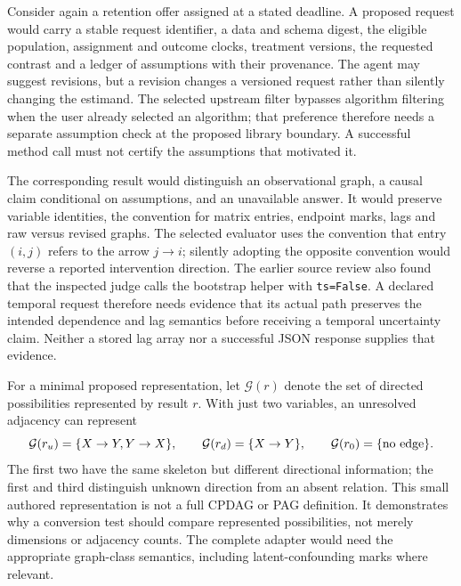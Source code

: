 Consider again a retention offer assigned at a stated deadline. A proposed
request would carry a stable request identifier, a data and schema digest,
the eligible population, assignment and outcome clocks, treatment versions,
the requested contrast and a ledger of assumptions with their provenance.
The agent may suggest revisions, but a revision changes a versioned request
rather than silently changing the estimand. The selected upstream filter
bypasses algorithm filtering when the user already selected an algorithm;
that preference therefore needs a separate assumption check at the proposed
library boundary. A successful method call must not certify the assumptions
that motivated it.~\citep{exec17_copilot_code}

The corresponding result would distinguish an observational graph, a causal
claim conditional on assumptions, and an unavailable answer. It would preserve
variable identities, the convention for matrix entries, endpoint marks, lags
and raw versus revised graphs. The selected evaluator uses the convention
that entry $(i,j)$ refers to the arrow $j\to i$; silently adopting the
opposite convention would reverse a reported intervention direction. The
earlier source review also found that the inspected judge calls the bootstrap
helper with \texttt{ts=False}. A declared temporal request therefore needs
evidence that its actual path preserves the intended dependence and lag
semantics before receiving a temporal uncertainty claim. Neither a stored
lag array nor a successful JSON response supplies that evidence.
\citep{exec17_copilot_code}

For a minimal proposed representation, let $\mathcal G(r)$ denote the set of
directed possibilities represented by result $r$. With just two variables,
an unresolved adjacency can represent
\[
 \mathcal G(r_u)=\{X\to Y,Y\to X\},\qquad
 \mathcal G(r_d)=\{X\to Y\},\qquad
 \mathcal G(r_0)=\{\hbox{no edge}\}.
\]
The first two have the same skeleton but different directional information;
the first and third distinguish unknown direction from an absent relation.
This small authored representation is not a full CPDAG or PAG definition. It
demonstrates why a conversion test should compare represented possibilities,
not merely dimensions or adjacency counts. The complete adapter would need
the appropriate graph-class semantics, including latent-confounding marks
where relevant.~\citep{exec25_copilot_choice}

